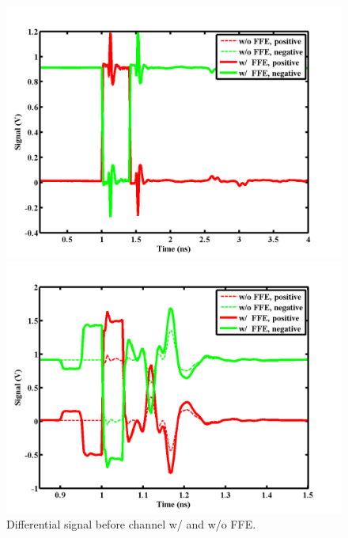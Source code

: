 \documentclass{book}  %
\begin{document}
\begin{paper}
\begin{figure}[htbp!]
	\centering	
	\begin{minipage}[tb]{0.495\textwidth}
		\centering	
		\includegraphics[width=\textwidth]{./img/Verilog/3G/1.png}
	\end{minipage}
	\begin{minipage}[tb]{0.495\textwidth}
		\centering	
		\includegraphics[width=\textwidth]{./img/Verilog/20G/1.png}
	\end{minipage}%
	\caption{Differential signal before channel w/ and w/o FFE.}
\end{figure}


\end{paper}
\end{document}
